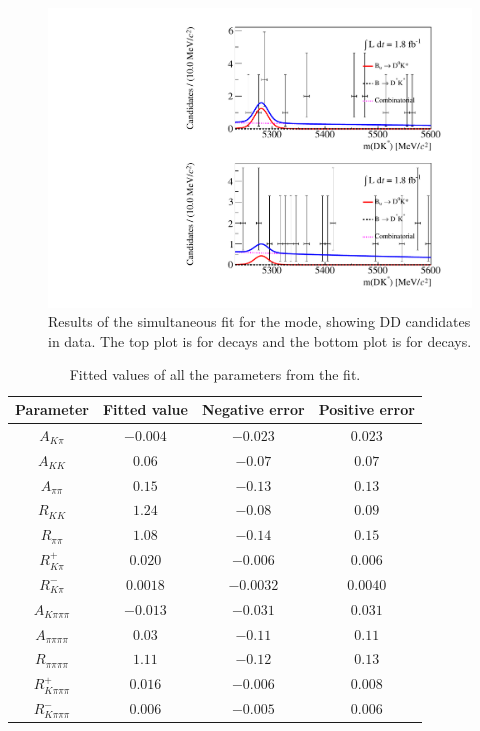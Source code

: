 \begin{figure}
\centering
\includegraphics[width=0.5\linewidth]{figures/results/canvas_d2pikpipi_DD_run2.pdf}
\caption{Results of the simultaneous fit for the \pikpipi mode, showing DD candidates in \runtwo data. The top plot is for \Bp decays and the bottom plot is for \Bm decays.}
\label{resultspikpipi}
\end{figure}


\begin{table}[h]
\centering
{\footnotesize
\begin{tabular}{cccc}
Parameter & Fitted value & Negative error & Positive error \\
\hline
$A_{K\pi}$ & $-0.004$ & $-0.023$ & $0.023$ \\
$A_{KK}$ & $0.06$ & $-0.07$ & $0.07$ \\
$A_{\pi\pi}$ & $0.15$ & $-0.13$ & $0.13$ \\
$R_{KK}$ & $1.24$ & $-0.08$ & $0.09$ \\
$R_{\pi\pi}$ & $1.08$ & $-0.14$ & $0.15$ \\
$R^+_{K\pi}$ & $0.020$ & $-0.006$ & $0.006$ \\
$R^-_{K\pi}$ & $0.0018$ & $-0.0032$ & $0.0040$ \\
$A_{K\pi\pi\pi}$ & $-0.013$ & $-0.031$ & $0.031$ \\
$A_{\pi\pi\pi\pi}$ & $0.03$ & $-0.11$ & $0.11$ \\
$R_{\pi\pi\pi\pi}$ & $1.11$ & $-0.12$ & $0.13$ \\
$R^+_{K\pi\pi\pi}$ & $0.016$ & $-0.006$ & $0.008$ \\
$R^-_{K\pi\pi\pi}$ & $0.006$ & $-0.005$ & $0.006$ \\
\end{tabular}}
\caption{Fitted values of all the \CP parameters from the \CP fit.}
\label{cpfitresultsphysics}
\end{table}

